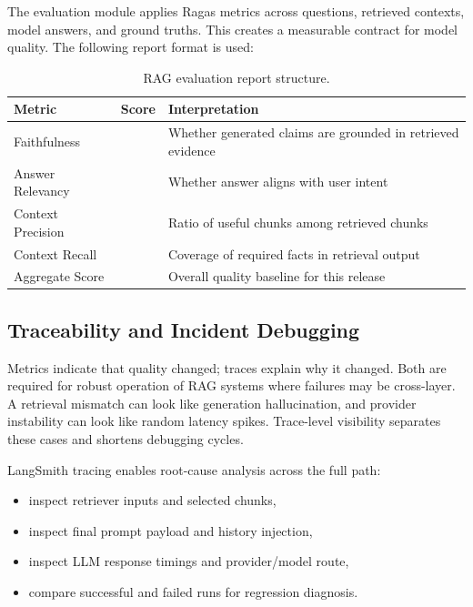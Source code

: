 \documentclass[12pt,letterpaper]{report}
\begin{document}
The evaluation module applies Ragas metrics across questions, retrieved contexts, model answers, and ground truths. This creates a measurable contract for model quality. The following report format is used:
\begin{table}[h]
\centering
\begin{tabular}{p{}p{}p{}}
\hline
\textbf{Metric} & \textbf{Score} & \textbf{Interpretation} \\
\hline
Faithfulness & \underline{\hspace{2cm}} & Whether generated claims are grounded in retrieved evidence \\
Answer Relevancy & \underline{\hspace{2cm}} & Whether answer aligns with user intent \\
Context Precision & \underline{\hspace{2cm}} & Ratio of useful chunks among retrieved chunks \\
Context Recall & \underline{\hspace{2cm}} & Coverage of required facts in retrieval output \\
Aggregate Score & \underline{\hspace{2cm}} & Overall quality baseline for this release \\
\hline
\end{tabular}
\caption{RAG evaluation report structure.}
\end{table}

\subsection{Traceability and Incident Debugging}
Metrics indicate that quality changed; traces explain why it changed. Both are required for robust operation of RAG systems where failures may be cross-layer. A retrieval mismatch can look like generation hallucination, and provider instability can look like random latency spikes. Trace-level visibility separates these cases and shortens debugging cycles.

LangSmith tracing enables root-cause analysis across the full path:
\begin{itemize}
\item inspect retriever inputs and selected chunks,
\item inspect final prompt payload and history injection,
\item inspect LLM response timings and provider/model route,
\item compare successful and failed runs for regression diagnosis.
\end{itemize}
\end{document}
